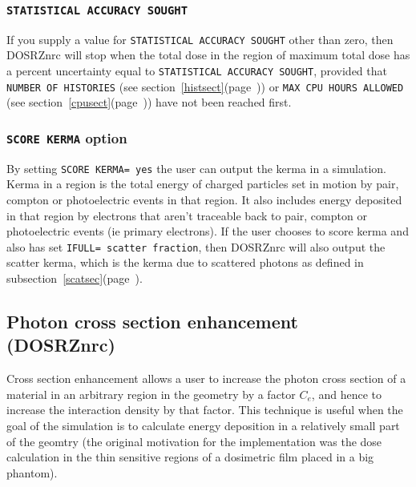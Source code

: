 \documentclass[12pt,twoside]{article}  %
\newcommand{\lpage}[1]{(page~\pageref{#1})}
\newcommand{\note}[1]{\mbox{}\\ \noindent \rule{16cm}{0.5mm} \\
{\em #1} \\ \noindent \rule{16cm}{0.5mm}\\
\typeout{******note: #1 *****}
}
\begin{document}
\subsubsection{{\tt STATISTICAL ACCURACY SOUGHT}}

If you supply a value for {\tt STATISTICAL ACCURACY SOUGHT} other than
zero, then DOSRZnrc will stop when the total dose in the region of
maximum total dose has a percent uncertainty equal to {\tt STATISTICAL
ACCURACY SOUGHT}, provided that {\tt NUMBER OF HISTORIES} (see
section~\ref{histsect}\lpage{histsect}) or {\tt MAX CPU HOURS ALLOWED}
(see section~\ref{cpusect}\lpage{cpusect}) have not been reached first.

\subsubsection{{\tt SCORE KERMA} option}

By setting {\tt SCORE KERMA= yes} the user can output the kerma in 
a simulation.  Kerma in a region is the total energy of charged particles 
set in motion by pair, compton or photoelectric events in that region.  It
also includes energy deposited in that region by electrons that
aren't traceable back to pair, compton or photoelectric events (ie 
primary electrons).  If the user chooses to score kerma and also has
set {\tt IFULL= scatter fraction}, then DOSRZnrc will also output the
scatter kerma, which is the kerma due to scattered photons as defined in
subsection~\ref{scatsec}\lpage{scatsec}. 

\subsection{Photon cross section enhancement (DOSRZnrc)}
\label{dosrz_cse}
 
Cross section enhancement allows a user to increase the photon cross
section of a material in an arbitrary region in the geometry
by a factor $C_e$,
and hence to increase the interaction density by that factor.
This technique is useful when the goal of the simulation is
to calculate energy deposition in a relatively small part
of the geomtry (the original motivation for the implementation
was the dose calculation in the thin sensitive regions of a
dosimetric film placed in a big phantom).
\end{document}
